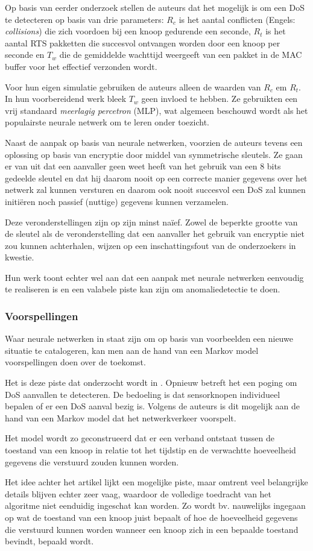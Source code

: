 Op basis van eerder onderzoek stellen de auteurs dat het mogelijk is om een DoS
te detecteren op basis van drie parameters: $R_c$ is het aantal conflicten
(Engels: \emph{collisions}) die zich voordoen bij een knoop gedurende een
seconde, $R_t$ is het aantal RTS pakketten die succesvol ontvangen worden door
een knoop per seconde en $T_w$ die de gemiddelde wachttijd weergeeft van een
pakket in de MAC buffer voor het effectief verzonden wordt.

Voor hun eigen simulatie gebruiken de auteurs alleen de waarden van $R_c$ em
$R_t$. In hun voorbereidend werk bleek $T_w$ geen invloed te hebben. Ze
gebruikten een vrij standaard \emph{meerlagig percetron} (MLP), wat algemeen
beschouwd wordt als het populairste neurale netwerk om te leren onder toezicht.

Naast de aanpak op basis van neurale netwerken, voorzien de auteurs tevens een
oplossing op basis van encryptie door middel van symmetrische sleutels. Ze gaan
er van uit dat een aanvaller geen weet heeft van het gebruik van een 8 bits
gedeelde sleutel en dat hij daarom nooit op een correcte manier gegevens over
het netwerk zal kunnen versturen en daarom ook nooit succesvol een DoS zal
kunnen initi\"eren noch passief (nuttige) gegevens kunnen verzamelen.

Deze veronderstellingen zijn op zijn minst na\"ief. Zowel de beperkte grootte
van de sleutel als de veronderstelling dat een aanvaller het gebruik van
encryptie niet zou kunnen achterhalen, wijzen op een inschattingsfout van de
onderzoekers in kwestie.

Hun werk toont echter wel aan dat een aanpak met neurale netwerken eenvoudig te
realiseren is en een valabele piste kan zijn om anomaliedetectie te doen.

\subsubsection*{Voorspellingen}
\label{subsubsection:predictions}

Waar neurale netwerken in staat zijn om op basis van voorbeelden een nieuwe
situatie te catalogeren, kan men aan de hand van een Markov model
voorspellingen doen over de toekomst.

Het is deze piste dat onderzocht wordt in \cite{zhijie2012intrusion}. Opnieuw
betreft het een poging om DoS aanvallen te detecteren. De bedoeling is dat
sensorknopen individueel bepalen of er een DoS aanval bezig is. Volgens de
auteurs is dit mogelijk aan de hand van een Markov model dat het netwerkverkeer
voorspelt.

Het model wordt zo geconstrueerd dat er een verband ontstaat tussen de toestand
van een knoop in relatie tot het tijdstip en de verwachtte hoeveelheid gegevens
die verstuurd zouden kunnen worden.

Het idee achter het artikel lijkt een mogelijke piste, maar omtrent veel
belangrijke details blijven echter zeer vaag, waardoor de volledige toedracht
van het algoritme niet eenduidig ingeschat kan worden. Zo wordt bv. nauwelijks
ingegaan op wat de toestand van een knoop juist bepaalt of hoe de
hoeveelheid gegevens die verstuurd kunnen worden wanneer een knoop zich in een
bepaalde toestand bevindt, bepaald wordt.
